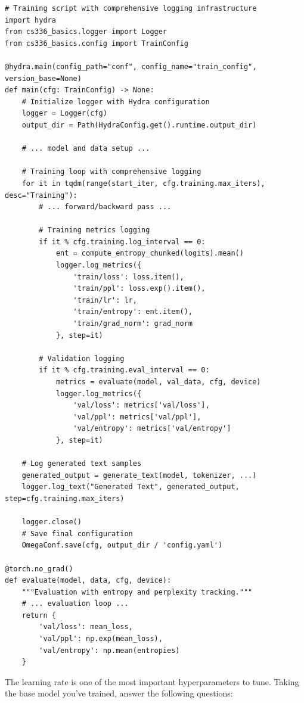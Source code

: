 \begin{lstlisting}
# Training script with comprehensive logging infrastructure
import hydra
from cs336_basics.logger import Logger
from cs336_basics.config import TrainConfig

@hydra.main(config_path="conf", config_name="train_config", version_base=None)
def main(cfg: TrainConfig) -> None:
    # Initialize logger with Hydra configuration
    logger = Logger(cfg)
    output_dir = Path(HydraConfig.get().runtime.output_dir)
    
    # ... model and data setup ...
    
    # Training loop with comprehensive logging
    for it in tqdm(range(start_iter, cfg.training.max_iters), desc="Training"):
        # ... forward/backward pass ...
        
        # Training metrics logging
        if it % cfg.training.log_interval == 0:
            ent = compute_entropy_chunked(logits).mean()
            logger.log_metrics({
                'train/loss': loss.item(), 
                'train/ppl': loss.exp().item(),
                'train/lr': lr,
                'train/entropy': ent.item(),
                'train/grad_norm': grad_norm
            }, step=it)
            
        # Validation logging
        if it % cfg.training.eval_interval == 0:
            metrics = evaluate(model, val_data, cfg, device)
            logger.log_metrics({
                'val/loss': metrics['val/loss'],
                'val/ppl': metrics['val/ppl'], 
                'val/entropy': metrics['val/entropy']
            }, step=it)
    
    # Log generated text samples
    generated_output = generate_text(model, tokenizer, ...)
    logger.log_text("Generated Text", generated_output, step=cfg.training.max_iters)
    
    logger.close()
    # Save final configuration
    OmegaConf.save(cfg, output_dir / 'config.yaml')

@torch.no_grad()
def evaluate(model, data, cfg, device):
    """Evaluation with entropy and perplexity tracking."""
    # ... evaluation loop ...
    return {
        'val/loss': mean_loss,
        'val/ppl': np.exp(mean_loss),
        'val/entropy': np.mean(entropies)
    }
\end{lstlisting}


The learning rate is one of the most important hyperparameters to tune. Taking the base model you've trained, answer the following questions:

